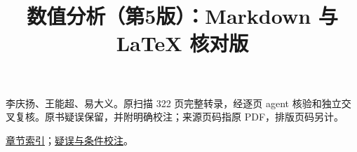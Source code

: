 \documentclass[
  10pt,
  fontset=fandol]{ctexart}
\title{数值分析（第5版）：Markdown 与 LaTeX 核对版}
\author{}
\date{}
\begin{document}
\maketitle

李庆扬、王能超、易大义。原扫描 322 页完整转录，经逐页 agent 核验和独立交叉复核。原书疑误保留，并附明确校注；来源页码指原 PDF，排版页码另计。

\href{index/INDEX.md}{章节索引}；\href{quality/ERRATA.md}{疑误与条件校注}。






















\end{document}
